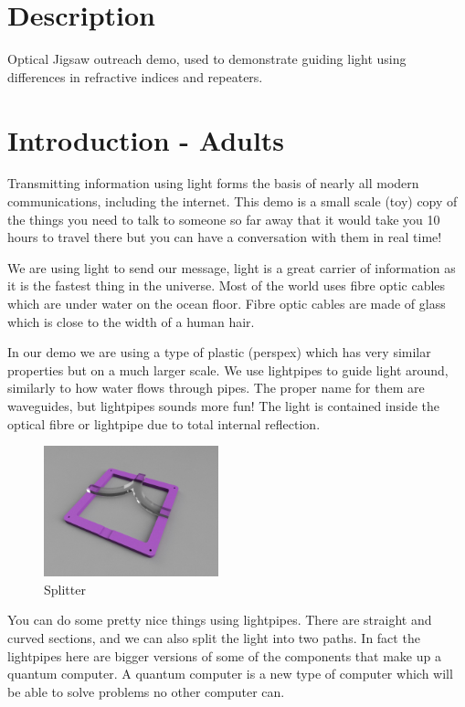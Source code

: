 \documentclass[12pt]{article}
\begin{document}
\section{Description}

Optical Jigsaw outreach demo, used to demonstrate guiding light using differences in refractive indices and repeaters.


\section{Introduction - Adults}

Transmitting information using light forms the basis of nearly all modern communications, including the internet. This demo is a small scale (toy) copy of the things you need to talk to someone so far away that it would take you 10 hours to travel there but you can have a conversation with them in real time! 

We are using light to send our message, light is a great carrier of information as it is the fastest thing in the universe. Most of the world uses fibre optic cables which are under water on the ocean floor. Fibre optic cables are made of glass which is close to the width of a human hair.

In our demo we are using a type of plastic (perspex) which has very similar properties but on a much larger scale. We use lightpipes to guide light around, similarly to how water flows through pipes. The proper name for them are waveguides, but lightpipes sounds more fun! The light is contained inside the optical fibre or lightpipe due to total internal reflection.

\begin{figure}[h]
\centering
\includegraphics[width=0.45\textwidth]{figures/jigsaw_y-junction.jpg}
\caption{Splitter}
\end{figure}

You can do some pretty nice things using lightpipes. There are straight and curved sections, and we can also split the light into two paths. In fact the lightpipes here are bigger versions of some of the components that make up a quantum computer. A quantum computer is a new type of computer which will be able to solve problems no other computer can.
\end{document}
